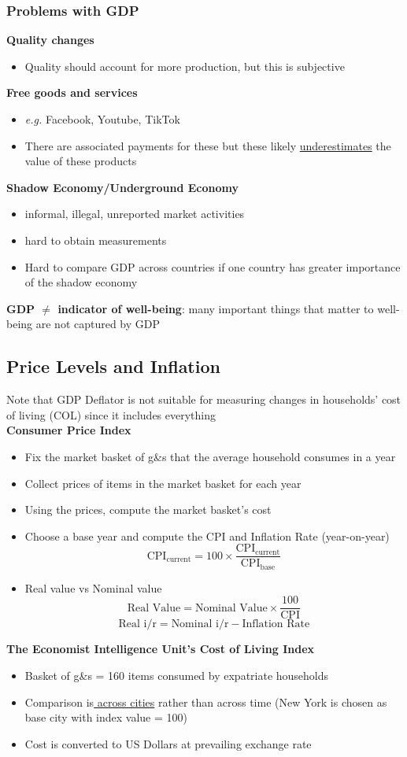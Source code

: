 \documentclass{article}
\newcommand{\eg}[0]{\textit{e.g. }}
\begin{document}
\begin{multicols}{2}
\subsubsection{Problems with GDP}
\textbf{Quality changes}
\begin{itemize}
	\item Quality should account for more production, but this is subjective
\end{itemize}
\textbf{Free goods and services}
\begin{itemize}
	\item \eg Facebook, Youtube, TikTok
	\item There are associated payments for these but these likely \underline{underestimates} the value of these products
\end{itemize}
\textbf{Shadow Economy/Underground Economy}
\begin{itemize}
	\item informal, illegal, unreported market activities
	\item hard to obtain measurements
	\item Hard to compare GDP across countries if one country has greater importance of the shadow economy
\end{itemize}
\textbf{GDP $\neq$ indicator of well-being}: many important things that matter to well-being are not captured by GDP

\subsection{Price Levels and Inflation}
Note that GDP Deflator is not suitable for measuring changes in households' cost of living (COL) since it includes everything\\
\textbf{Consumer Price Index}
\begin{itemize}
	\item Fix the market basket of g\&s that the average household consumes in a year
	\item Collect prices of items in the market basket for each year
	\item Using the prices, compute the market basket's cost
	\item Choose a base year and compute the CPI and Inflation Rate (year-on-year)
	$$\text{CPI}_\text{current} = 100 \times \frac{\text{CPI}_\text{current}}{\text{CPI}_\text{base}}$$
	\item Real value vs Nominal value
	$$\text{Real Value} = \text{Nominal Value} \times \frac{100}{\text{CPI}}$$
	$$\text{Real i/r} = \text{Nominal i/r} - \text{Inflation Rate}$$
\end{itemize}
\textbf{The Economist Intelligence Unit's Cost of Living Index}
\begin{itemize}
	\item Basket of g\&s = 160 items consumed by expatriate households
	\item Comparison is\underline{ across cities} rather than across time (New York is chosen as base city with index value = 100)
	\item Cost is converted to US Dollars at prevailing exchange rate
\end{itemize}

\end{multicols}
\end{document}
